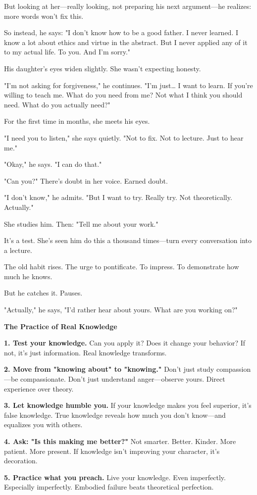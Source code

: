 \documentclass[11pt,twoside]{book}
\begin{document}
But looking at her—really looking, not preparing his next argument—he realizes: more words won't fix this.

So instead, he says: "I don't know how to be a good father. I never learned. I know a lot about ethics and virtue in the abstract. But I never applied any of it to my actual life. To you. And I'm sorry."

His daughter's eyes widen slightly. She wasn't expecting honesty.

"I'm not asking for forgiveness," he continues. "I'm just\ldots{} I want to learn. If you're willing to teach me. What do you need from me? Not what I think you should need. What do you actually need?"

For the first time in months, she meets his eyes.

"I need you to listen," she says quietly. "Not to fix. Not to lecture. Just to hear me."

"Okay," he says. "I can do that."

"Can you?" There's doubt in her voice. Earned doubt.

"I don't know," he admits. "But I want to try. Really try. Not theoretically. Actually."

She studies him. Then: "Tell me about your work."

It's a test. She's seen him do this a thousand times—turn every conversation into a lecture.

The old habit rises. The urge to pontificate. To impress. To demonstrate how much he knows.

But he catches it. Pauses.

"Actually," he says, "I'd rather hear about yours. What are you working on?"

\begin{practicebox}
\textbf{The Practice of Real Knowledge}

\textbf{1. Test your knowledge.} Can you apply it? Does it change your behavior? If not, it's just information. Real knowledge transforms.

\textbf{2. Move from "knowing about" to "knowing."} Don't just study compassion—be compassionate. Don't just understand anger—observe yours. Direct experience over theory.

\textbf{3. Let knowledge humble you.} If your knowledge makes you feel superior, it's false knowledge. True knowledge reveals how much you don't know—and equalizes you with others.

\textbf{4. Ask: "Is this making me better?"} Not smarter. Better. Kinder. More patient. More present. If knowledge isn't improving your character, it's decoration.

\textbf{5. Practice what you preach.} Live your knowledge. Even imperfectly. Especially imperfectly. Embodied failure beats theoretical perfection.
\end{practicebox}
\end{document}
